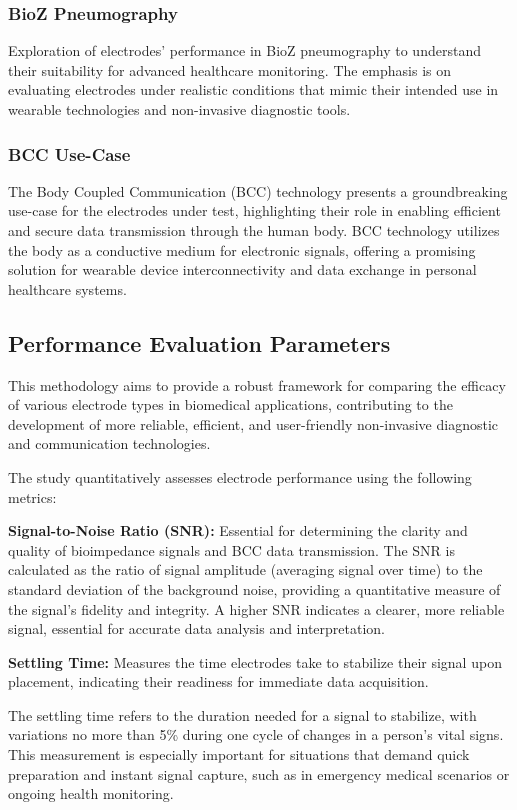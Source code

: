 \documentclass[conference]{IEEEtran}
\begin{document}
\subsubsection{BioZ Pneumography}
Exploration of electrodes' performance in BioZ pneumography to understand their suitability for advanced healthcare monitoring. The emphasis is on evaluating electrodes under realistic conditions that mimic their intended use in wearable technologies and non-invasive diagnostic tools.

\subsubsection{BCC Use-Case}
The Body Coupled Communication (BCC) technology presents a groundbreaking use-case for the electrodes under test, highlighting their role in enabling efficient and secure data transmission through the human body. BCC technology utilizes the body as a conductive medium for electronic signals, offering a promising solution for wearable device interconnectivity and data exchange in personal healthcare systems. 



\subsection{Performance Evaluation Parameters}
This methodology aims to provide a robust framework for comparing the efficacy of various electrode types in biomedical applications, contributing to the development of more reliable, efficient, and user-friendly non-invasive diagnostic and communication technologies. 

The study quantitatively assesses electrode performance using the following metrics:

 \textbf{Signal-to-Noise Ratio (SNR):} Essential for determining the clarity and quality of bioimpedance signals and BCC data transmission.
    The SNR is calculated as the ratio of signal amplitude (averaging signal over time) to the standard deviation of the background noise, providing a quantitative measure of the signal's fidelity and integrity. A higher SNR indicates a clearer, more reliable signal, essential for accurate data analysis and interpretation.
    
\textbf{Settling Time:} Measures the time electrodes take to stabilize their signal upon placement, indicating their readiness for immediate data acquisition.
    
    The settling time refers to the duration needed for a signal to stabilize, with variations no more than 5\% during one cycle of changes in a person's vital signs. This measurement is especially important for situations that demand quick preparation and instant signal capture, such as in emergency medical scenarios or ongoing health monitoring.
    
\end{document}
